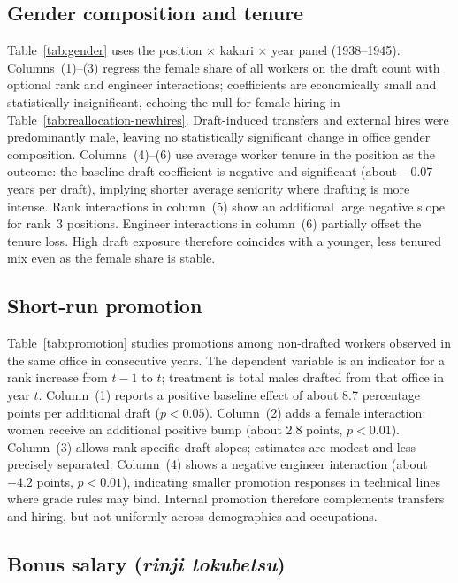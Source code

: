\subsection{Gender composition and tenure}

Table~\ref{tab:gender} uses the position $\times$ kakari $\times$ year panel (1938--1945). Columns~(1)--(3) regress the female share of all workers on the draft count with optional rank and engineer interactions; coefficients are economically small and statistically insignificant, echoing the null for female hiring in Table~\ref{tab:reallocation-newhires}. Draft-induced transfers and external hires were predominantly male, leaving no statistically significant change in office gender composition. Columns~(4)--(6) use average worker tenure in the position as the outcome: the baseline draft coefficient is negative and significant (about $-0.07$ years per draft), implying shorter average seniority where drafting is more intense. Rank interactions in column~(5) show an additional large negative slope for rank~3 positions. Engineer interactions in column~(6) partially offset the tenure loss. High draft exposure therefore coincides with a younger, less tenured mix even as the female share is stable.

\subsection{Short-run promotion}

Table~\ref{tab:promotion} studies promotions among non-drafted workers observed in the same office in consecutive years. The dependent variable is an indicator for a rank increase from $t-1$ to $t$; treatment is total males drafted from that office in year $t$. Column~(1) reports a positive baseline effect of about 8.7 percentage points per additional draft ($p<0.05$). Column~(2) adds a female interaction: women receive an additional positive bump (about 2.8 points, $p<0.01$). Column~(3) allows rank-specific draft slopes; estimates are modest and less precisely separated. Column~(4) shows a negative engineer interaction (about $-4.2$ points, $p<0.01$), indicating smaller promotion responses in technical lines where grade rules may bind. Internal promotion therefore complements transfers and hiring, but not uniformly across demographics and occupations.

\subsection{Bonus salary (\emph{rinji tokubetsu})}


